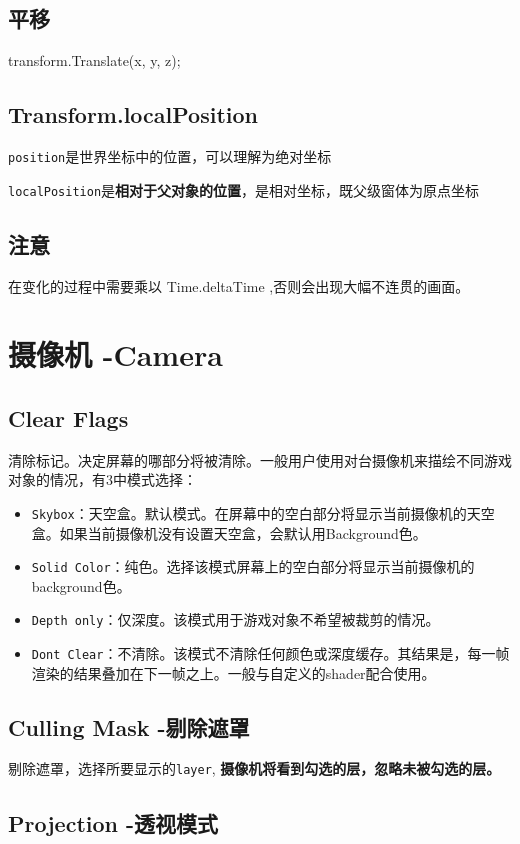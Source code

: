 \documentclass[UTF8,a4paper,12pt]{ctexbook}
\begin{document}
		\subsection{平移}
				transform.Translate(x, y, z); 
		\subsection{Transform.localPosition}
			\verb|position|是世界坐标中的位置，可以理解为绝对坐标 
			
			\verb|localPosition|是\textbf{相对于父对象的位置}，是相对坐标，既父级窗体为原点坐标
		\subsection{注意}
			在变化的过程中需要乘以 Time.deltaTime ,否则会出现大幅不连贯的画面。
	
	\section{摄像机 -Camera}
		\subsection{Clear Flags}
			清除标记。决定屏幕的哪部分将被清除。一般用户使用对台摄像机来描绘不同游戏对象的情况，有3中模式选择：
			\begin{itemize}
				\item \verb|Skybox|：天空盒。默认模式。在屏幕中的空白部分将显示当前摄像机的天空盒。如果当前摄像机没有设置天空盒，会默认用Background色。
				\item \verb|Solid Color|：纯色。选择该模式屏幕上的空白部分将显示当前摄像机的background色。
				\item \verb|Depth only|：仅深度。该模式用于游戏对象不希望被裁剪的情况。
				\item \verb|Dont Clear|：不清除。该模式不清除任何颜色或深度缓存。其结果是，每一帧渲染的结果叠加在下一帧之上。一般与自定义的shader配合使用。
			\end{itemize}
		\subsection{Culling Mask -剔除遮罩} 
			剔除遮罩，选择所要显示的\verb|layer|, \textbf{摄像机将看到勾选的层，忽略未被勾选的层。}
		
		\subsection{Projection -透视模式}
\end{document}

